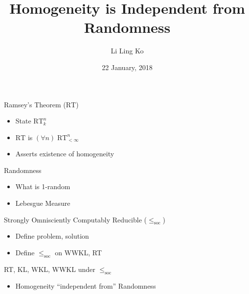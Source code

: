 \documentclass[notes]{beamer}
\title{Homogeneity is Independent from Randomness}
\author{Li Ling Ko}
\institute{University of Notre Dame}
\date{22 January, 2018}
\begin{document}
\begin{frame}
  \titlepage
\end{frame}

\begin{frame}{Ramsey's Theorem ($\text{RT}$)}
  \begin{itemize}
    \item State $\text{RT}_k^n$
    \item $\text{RT}$ is $(\forall n)\; \text{RT}_{<\infty}^n$
  \end{itemize}

  \begin{itemize}
    \item Asserts existence of homogeneity
  \end{itemize}
\end{frame}

\begin{frame}{Randomness}
  \begin{itemize}
    \item What is 1-random
    \item Lebesgue Measure
  \end{itemize}
\end{frame}

\begin{frame}{Strongly Omnisciently Computably Reducible
  ($\leq_{\text{soc}}$)}
  \begin{itemize}
    \item Define problem, solution
    \item Define $\leq_{\text{soc}}$ on WWKL, RT
  \end{itemize}
\end{frame}


\begin{frame}{RT, KL, WKL, WWKL under $\leq_{\text{soc}}$}
  \begin{itemize}
    \item Homogeneity ``independent from'' Randomness
  \end{itemize}

  \begin{center}
  \end{center}
\end{frame}
\end{document}
